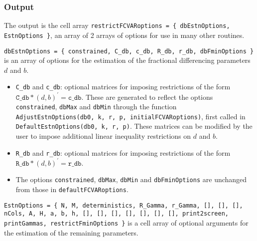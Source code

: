 \documentclass[12pt]{article}
\begin{document}
\subsubsection*{Output}
 
The output is the cell array \texttt{restrictFCVARoptions = \{ dbEstnOptions, EstnOptions \}}, an array of 2 arrays of options for use in many other routines. 

\bigskip

\noindent \texttt{dbEstnOptions = \{ constrained, C\_db, c\_db, R\_db, r\_db, dbFminOptions \}} is an array of options for the estimation of the fractional differencing parameters $d$ and $b$.

\begin{itemize}

\item \texttt{C\_db} and \texttt{c\_db}: optional matrices for imposing restrictions of the form $\texttt{C\_db} * (d, b)^{\prime} = \texttt{c\_db}$. These are generated to reflect the options \texttt{constrained}, \texttt{dbMax} and \texttt{dbMin} through the function \texttt{AdjustEstnOptions(db0, k, r, p, initialFCVARoptions)}, first called in \texttt{DefaultEstnOptions(db0, k, r, p)}. These matrices can be modified by the user to impose additional linear inequality restrictions on $d$ and $b$. 

\item \texttt{R\_db} and \texttt{r\_db}: optional matrices for imposing restrictions of the form $\texttt{R\_db} * (d, b)^{\prime} = \texttt{r\_db}$. 

\item The options \texttt{constrained}, \texttt{dbMax}, \texttt{dbMin} and \texttt{dbFminOptions} are unchanged from those in \texttt{defaultFCVARoptions}.

\end{itemize}




\noindent \texttt{EstnOptions  = \{ N, M, deterministics, R\_Gamma, r\_Gamma, [], [], [], nCols, A, H, a, b, h, [], [], [], [], [], [], [], print2screen, printGammas, restrictFminOptions \}} is a cell array of optional arguments for the estimation of the remaining parameters. 
 
\end{document}
